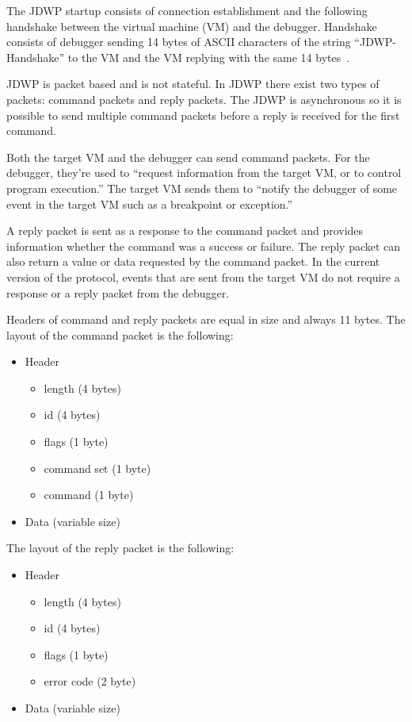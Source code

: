 \documentclass[..thesis.tex]{subfiles}
\begin{document}
% 
% 
The JDWP startup consists of connection establishment and the following handshake between the virtual machine (VM) and the debugger.
Handshake consists of debugger sending 14 bytes of ASCII characters of the string \enquote{JDWP-Handshake} to the VM and the VM replying with the same 14 bytes~\cite{oracle_jdwp_spec}.

JDWP is packet based and is not stateful. In JDWP there exist two types of packets: command packets and reply packets.
The JDWP is asynchronous so it is possible to send multiple command packets before a reply is received for the first command.

Both the target VM and the debugger can send command packets. For the debugger, they're used to \enquote{request information from the target VM, or to control program execution.}
The target VM sends them to \enquote{notify the debugger of some event in the target VM such as a breakpoint or exception.}~\cite{oracle_jdwp_spec}

A reply packet is sent as a response to the command packet and provides information whether the command was a success or failure. The reply packet can also return a value or data requested by the command packet. In the current version of the protocol, events that are sent from the target VM do not require a response or a reply packet from the debugger.\cite{oracle_jdwp_spec}

Headers of command and reply packets are equal in size and always 11 bytes. The layout of the command packet is the following:
\begin{itemize}[nosep]
  \item Header
    \begin{itemize}[nosep]
      \item length (4 bytes)
      \item id (4 bytes)
      \item flags (1 byte)
      \item command set (1 byte)
      \item command (1 byte)
    \end{itemize}
  \item Data (variable size) 
\end{itemize}

The layout of the reply packet is the following:
\begin{itemize}[nosep]
  \item Header
    \begin{itemize}[nosep]
      \item length (4 bytes)
      \item id (4 bytes)
      \item flags (1 byte)
      \item error code (2 byte)
    \end{itemize}
  \item Data (variable size) 
\end{itemize}
\end{document}
